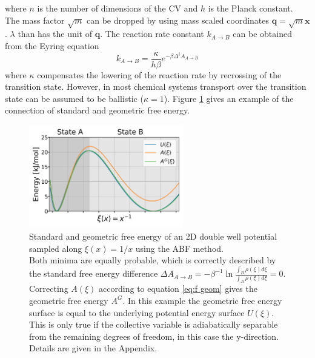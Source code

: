 where $n$ is the number of dimensions of the CV and $h$ is the Planck constant. The mass factor $\sqrt{m}$ can be dropped by using mass scaled coordinates $\textbf{q}=\sqrt{m}\textbf{x}$. $\lambda$ than has the unit of $\textbf{q}$.
The reaction rate constant $k_{A\rightarrow B}$ can be obtained from the Eyring equation
\begin{equation}
  k_{A\rightarrow B} = \frac{\kappa}{h\beta}e^{-\beta \Delta^\ddagger A_{A\rightarrow B}}
\end{equation}
where $\kappa$ compensates the lowering of the reaction rate by recrossing of the transition state. However, in most chemical systems transport over the transition state can be assumed to be ballistic ($\kappa=1$).\autocite{bal2020free} Figure \ref{fig:F geom} gives an example of the connection of standard and geometric free energy.
\begin{figure}[H]
    \centering
    \includegraphics[width=0.6\textwidth]{bilder/geom_free_energy}
    \caption{
      Standard and geometric free energy of an 2D double well potential sampled along $\xi(x)=1/x$ using the ABF method.\\
      Both minima are equally probable, which is correctly described by the standard free energy difference $\Delta A_{A\rightarrow B}=-\beta^{-1}\ln \frac{\int_B \rho(\xi)d\xi}{\int_A \rho(\xi)d\xi}=0$.\\
      Correcting $A(\xi)$ according to equation \ref{eq:f geom} gives the geometric free energy $A^G$. In this example the geometric free energy surface is equal to the underlying potential energy surface $U(\xi)$. This is only true if the collective variable is adiabatically separable from the remaining degrees of freedom, in this case the y-direction.\autocite{hartmann2011two} Details are given in the Appendix.
    }
\label{fig:F geom}%
\end{figure}
